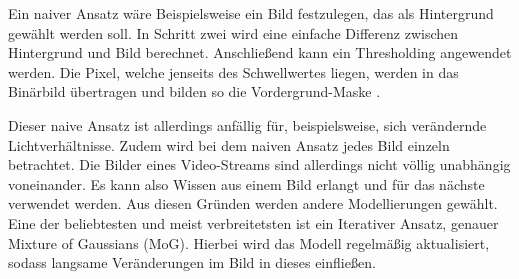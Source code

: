 Ein naiver Ansatz wäre Beispielsweise ein Bild festzulegen, das als Hintergrund gewählt werden soll. In Schritt zwei wird eine einfache Differenz zwischen Hintergrund und Bild berechnet. Anschließend kann ein Thresholding angewendet werden. Die Pixel, welche jenseits des Schwellwertes liegen, werden in das Binärbild übertragen und bilden so die Vordergrund-Maske \autocite[3]{foreground2003}. 

Dieser naive Ansatz ist allerdings anfällig für, beispielsweise, sich verändernde Lichtverhältnisse. Zudem wird bei dem naiven Ansatz jedes Bild einzeln betrachtet. Die Bilder eines Video-Streams sind allerdings nicht völlig unabhängig voneinander. Es kann also Wissen aus einem Bild erlangt und für das nächste verwendet werden. Aus diesen Gründen werden andere Modellierungen gewählt. Eine der beliebtesten und meist verbreitetsten ist ein Iterativer Ansatz, genauer Mixture of Gaussians (MoG). Hierbei wird das Modell regelmäßig aktualisiert, sodass langsame Veränderungen im Bild in dieses einfließen. \autocite[4]{foreground2003}

